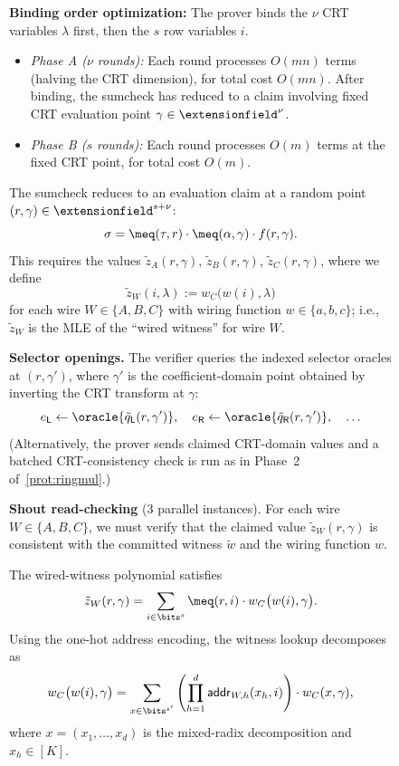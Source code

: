 \begin{figure}[H]
\begin{algorithm}[H]
\begin{algorithmic}[1]
    \medskip
    \textbf{Binding order optimization:} The prover binds the $\nu$ CRT variables $\lambda$ first, then the $s$ row variables $i$.
    \begin{itemize}
        \item \emph{Phase A ($\nu$ rounds):} Each round processes $O(mn)$ terms (halving the CRT dimension), for total cost $O(mn)$.
        After binding, the sumcheck has reduced to a claim involving fixed CRT evaluation point $\gamma \in \extensionfield^\nu$.
        \item \emph{Phase B ($s$ rounds):} Each round processes $O(m)$ terms at the fixed CRT point, for total cost $O(m)$.
    \end{itemize}
    The sumcheck reduces to an evaluation claim at a random point $(r, \gamma) \in \extensionfield^{s+\nu}$:
    \[
        \sigma = \meq(\tau, r) \cdot \meq(\alpha, \gamma) \cdot f(r, \gamma).
    \]
    This requires the values $\tilde{z}_A(r, \gamma)$, $\tilde{z}_B(r, \gamma)$, $\tilde{z}_C(r, \gamma)$, where we define
    \[
        \tilde{z}_W(i, \lambda) := w_C\bigl(w(i), \lambda\bigr)
    \]
    for each wire $W \in \{A, B, C\}$ with wiring function $w \in \{a, b, c\}$; i.e., $\tilde{z}_W$ is the MLE of the ``wired witness'' for wire $W$.

    \STATE \textbf{Selector openings.} The verifier queries the indexed selector oracles at $(r, \gamma')$, where $\gamma'$ is the coefficient-domain point obtained by inverting the CRT transform at $\gamma$:
    \[
        e_\mathsf{L} \gets \oracle{\tilde{q}_\mathsf{L}(r, \gamma')}, \quad
        e_\mathsf{R} \gets \oracle{\tilde{q}_\mathsf{R}(r, \gamma')}, \quad \ldots
    \]
    (Alternatively, the prover sends claimed CRT-domain values and a batched CRT-consistency check is run as in Phase~2 of~\cref{prot:ringmul}.)

    \STATE \textbf{Shout read-checking} (3 parallel instances).
    For each wire $W \in \{A, B, C\}$, we must verify that the claimed value $\tilde{z}_W(r, \gamma)$ is consistent with the committed witness $\tilde{w}$ and the wiring function $w$.

    The wired-witness polynomial satisfies
    \begin{equation}\label{eq:wired-witness}
        \tilde{z}_W(r, \gamma) = \sum_{i \in \bits^s} \meq(r, i) \cdot w_C\bigl(w(i), \gamma\bigr).
    \end{equation}
    Using the one-hot address encoding, the witness lookup decomposes as
    \begin{equation}\label{eq:shout-lookup}
        w_C\bigl(w(i), \gamma\bigr) = \sum_{x \in \bits^{s'}} \left(\prod_{h=1}^d \mathsf{addr}_{W,h}(x_h, i)\right) \cdot w_C(x, \gamma),
    \end{equation}
    where $x = (x_1, \ldots, x_d)$ is the mixed-radix decomposition and $x_h \in [K]$.


\end{algorithmic}
\end{algorithm}
\end{figure}
